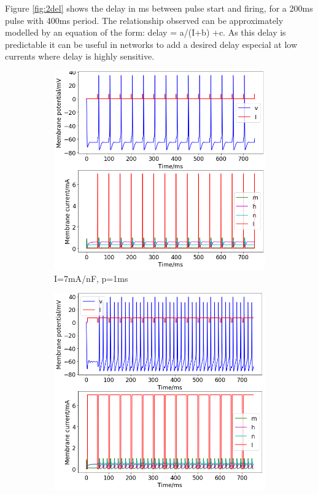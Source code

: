 \documentclass[twoside,twocolumn]{article}
\begin{document}
Figure \ref{fig:2del} shows the delay in ms between pulse start and firing, for a 200ms pulse with 400ms period. The relationship observed can be approximately modelled by an equation of the form: delay = a/(I+b) +c. As this delay is predictable it can be useful in networks to add a desired delay especial at low currents where delay is highly sensitive.



\onecolumn

\begin{figure}[h]
  \centering
  \begin{subfigure}[t]{0.49\textwidth}
    \includegraphics[width=\linewidth]{p7-1}
  \caption{I=7mA/nF, p=1ms}
  \label{sub:2c7-1}
  \end{subfigure}
  \begin{subfigure}[t]{0.49\textwidth}
    \includegraphics[width=\linewidth]{p7-45}

\end{subfigure}
\end{figure}
\end{document}
